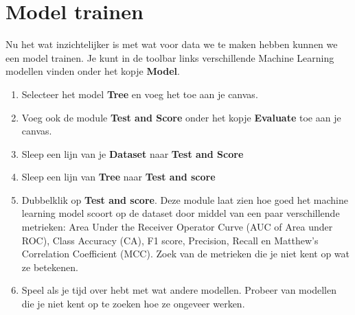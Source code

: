\documentclass{article}
\newcommand{\tb}[1]{\textbf{#1}}
\begin{document}
\section{Model trainen}
Nu het wat inzichtelijker is met wat voor data we te maken hebben kunnen we een model trainen. Je kunt in de toolbar links verschillende Machine Learning modellen vinden onder het kopje \tb{Model}.

\begin{enumerate}
\item Selecteer het model \tb{Tree} en voeg het toe aan je canvas.
\item Voeg ook de module \tb{Test and Score} onder het kopje \tb{Evaluate} toe aan je canvas.
\item Sleep een lijn van je \tb{Dataset} naar \tb{Test and Score}
\item Sleep een lijn van \tb{Tree} naar \tb{Test and score}
\item Dubbelklik op \tb{Test and score}. Deze module laat zien hoe goed het machine learning model scoort op de dataset door middel van een paar verschillende metrieken: Area Under the Receiver Operator Curve (AUC of Area under ROC), Class Accuracy (CA), F1 score, Precision, Recall en Matthew's Correlation Coefficient (MCC). Zoek van de metrieken die je niet kent op wat ze betekenen.
\item Speel als je tijd over hebt met wat andere modellen. Probeer van modellen die je niet kent op te zoeken hoe ze ongeveer werken.
\end{enumerate}
\end{document}
